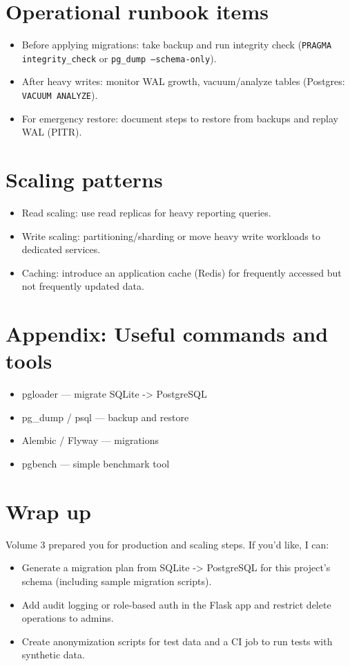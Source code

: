 \documentclass[11pt,a4paper]{article}
\begin{document}
\section{Operational runbook items}
\begin{itemize}
  \item Before applying migrations: take backup and run integrity check (\texttt{PRAGMA integrity_check} or \texttt{pg_dump --schema-only}).
  \item After heavy writes: monitor WAL growth, vacuum/analyze tables (Postgres: \texttt{VACUUM ANALYZE}).
  \item For emergency restore: document steps to restore from backups and replay WAL (PITR).
\end{itemize}

\section{Scaling patterns}
\begin{itemize}
  \item Read scaling: use read replicas for heavy reporting queries.
  \item Write scaling: partitioning/sharding or move heavy write workloads to dedicated services.
  \item Caching: introduce an application cache (Redis) for frequently accessed but not frequently updated data.
\end{itemize}

\section*{Appendix: Useful commands and tools}
\begin{itemize}
  \item pgloader — migrate SQLite -> PostgreSQL
  \item pg_dump / psql — backup and restore
  \item Alembic / Flyway — migrations
  \item pgbench — simple benchmark tool
\end{itemize}

\section*{Wrap up}
Volume 3 prepared you for production and scaling steps. If you'd like, I can:
\begin{itemize}
  \item Generate a migration plan from SQLite -> PostgreSQL for this project's schema (including sample migration scripts).
  \item Add audit logging or role-based auth in the Flask app and restrict delete operations to admins.
  \item Create anonymization scripts for test data and a CI job to run tests with synthetic data.
\end{itemize}
\end{document}
